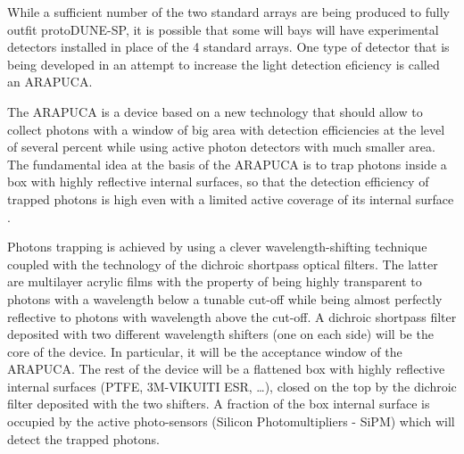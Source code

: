 While a sufficient number of the two standard arrays are being produced to fully outfit protoDUNE-SP, it is possible that some will bays will have experimental detectors installed in place 
of the 4 standard arrays. One type of detector that is being developed in an attempt to increase the light detection eficiency is called an ARAPUCA.

The ARAPUCA is a device based on a new technology that should allow to collect photons with a window of big area with detection efficiencies at the level of several percent while using 
active photon detectors with much smaller area.
The fundamental idea at the basis of the ARAPUCA is to trap photons inside a box with highly reflective internal surfaces, so that the detection efficiency of trapped photons is high even with a  limited active coverage of its internal surface \cite{arapuca_jinst}.

Photons trapping is achieved by using a clever wavelength-shifting technique coupled with the technology of the dichroic shortpass optical filters. The latter are multilayer acrylic films 
with the  property of being highly transparent to photons with a wavelength below a tunable cut-off while being almost perfectly reflective to photons with wavelength above the cut-off. 
A dichroic shortpass filter deposited with two different wavelength shifters (one on each side) will be the core of the device. In particular, it will be the acceptance window of the 
ARAPUCA. The rest of the device will be a flattened box with highly reflective internal surfaces (PTFE, 3M-VIKUITI ESR, \dots), closed on the top by the 
dichroic  filter deposited with the two shifters. A fraction of the box internal surface is occupied by the active photo-sensors (Silicon Photomultipliers - SiPM) which will detect the trapped photons.

